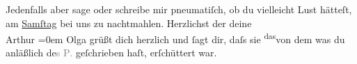 \begin{ledgroupsized}[t]{13cm}
           \pstart
           Jedenfalls aber sage oder schreibe mir pneumatiſch, ob du vielleicht Lust hätteſt, am
                  \uline{Samſtag} bei uns zu nachtmahlen.\pend
           \pstart
           Herzlichst der deine{\\[\baselineskip]}\spacefill\mbox{Arthur{\pb}}\pend
           \leftskip=0em{}\pstart
           \noindent{}Olga grüßt dich herzlich und ſagt dir, daſs
                  sie \substVorne{}\textsuperscript{das}\substDazwischen{}von dem\substHinten{} was du anläßlich de\textcolor{gray}{s \textsc{P}.}
                  geſchrieben haſt, erſchüttert war.\pend
           
         
         \endnumbering{}\end{ledgroupsized}  \newcommand{\dateiname}{L01477}\newcommand{\titel}{Arthur Schnitzler an Hermann Bahr, 14. 12. 1904}\newcommand{\editorInnen}{ Kurt Ifkovits,  Martin Anton Müller}
      